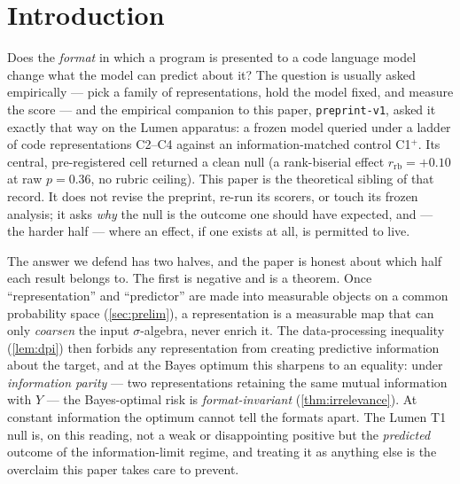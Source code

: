 \section{Introduction}
\label{sec:intro}

Does the \emph{format} in which a program is presented to a code language model
change what the model can predict about it? The question is usually asked
empirically --- pick a family of representations, hold the model fixed, and
measure the score --- and the empirical companion to this paper,
\texttt{preprint-v1}, asked it exactly that way on the Lumen apparatus: a frozen
model queried under a ladder of code representations C2--C4 against an
information-matched control C1${}^{+}$. Its central, pre-registered cell
returned a clean null (a rank-biserial effect $r_{\mathrm{rb}}=+0.10$ at raw
$p=0.36$, no rubric ceiling). This paper is the theoretical sibling of that
record. It does not revise the preprint, re-run its scorers, or touch its frozen
analysis; it asks \emph{why} the null is the outcome one should have expected,
and --- the harder half --- where an effect, if one exists at all, is permitted
to live.

The answer we defend has two halves, and the paper is honest about which half
each result belongs to. The first is negative and is a theorem. Once
``representation'' and ``predictor'' are made into measurable objects on a common
probability space (\cref{sec:prelim}), a representation is a measurable map that
can only \emph{coarsen} the input $\sigma$-algebra, never enrich it. The
data-processing inequality (\cref{lem:dpi}) then forbids any representation from
creating predictive information about the target, and at the Bayes optimum this
sharpens to an equality: under \emph{information parity} --- two representations
retaining the same mutual information with $Y$ --- the Bayes-optimal risk is
\emph{format-invariant} (\cref{thm:irrelevance}). At constant information the
optimum cannot tell the formats apart. The Lumen T1 null is, on this reading,
not a weak or disappointing positive but the \emph{predicted} outcome of the
information-limit regime, and treating it as anything else is the overclaim this
paper takes care to prevent.

